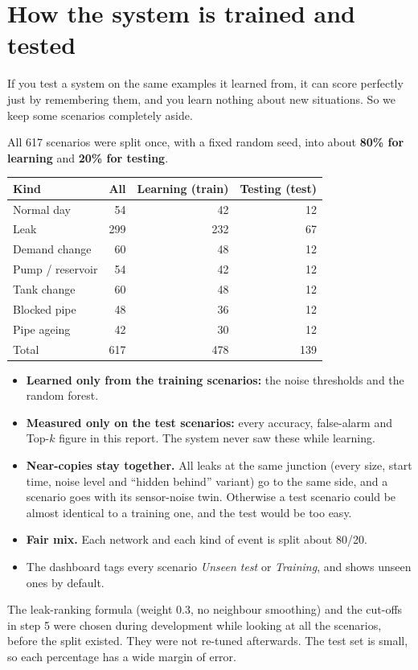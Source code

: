 \documentclass[11pt,a4paper]{article}
\begin{document}
\section{How the system is trained and tested}
\begin{key}
If you test a system on the same examples it learned from, it can score perfectly just by remembering them, and you learn nothing about new situations. So we keep some scenarios completely aside.
\end{key}
All 617 scenarios were split once, with a fixed random seed, into about \textbf{80\% for learning} and \textbf{20\% for testing}.
\begin{center}\small\begin{tabular}{@{}lrrr@{}}\toprule
Kind & All & Learning (train) & Testing (test) \\\midrule
Normal day & 54 & 42 & 12 \\
Leak & 299 & 232 & 67 \\
Demand change & 60 & 48 & 12 \\
Pump / reservoir & 54 & 42 & 12 \\
Tank change & 60 & 48 & 12 \\
Blocked pipe & 48 & 36 & 12 \\
Pipe ageing & 42 & 30 & 12 \\
\midrule
Total & 617 & 478 & 139 \\
\bottomrule\end{tabular}\end{center}
\begin{itemize}[itemsep=3pt]
\item \textbf{Learned only from the training scenarios:} the noise thresholds and the random forest.
\item \textbf{Measured only on the test scenarios:} every accuracy, false-alarm and Top-$k$ figure in this report. The system never saw these while learning.
\item \textbf{Near-copies stay together.} All leaks at the same junction (every size, start time, noise level and ``hidden behind'' variant) go to the same side, and a scenario goes with its sensor-noise twin. Otherwise a test scenario could be almost identical to a training one, and the test would be too easy.
\item \textbf{Fair mix.} Each network and each kind of event is split about 80/20.
\item The dashboard tags every scenario \emph{Unseen test} or \emph{Training}, and shows unseen ones by default.
\end{itemize}
The leak-ranking formula (weight 0.3, no neighbour smoothing) and the cut-offs in step 5 were chosen during development while looking at all the scenarios, before the split existed. They were not re-tuned afterwards. The test set is small, so each percentage has a wide margin of error.
\end{document}
